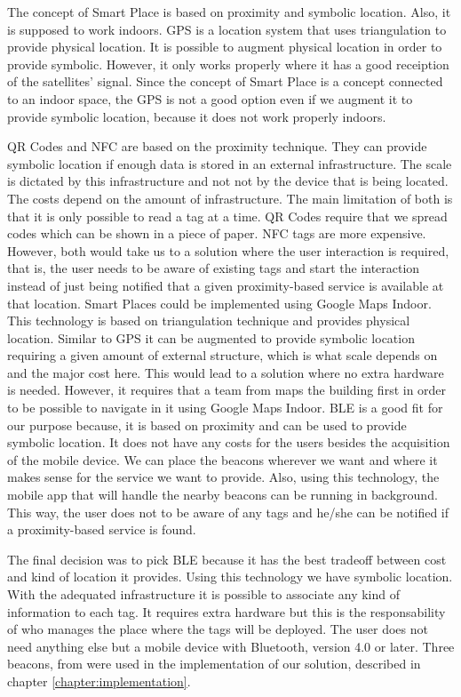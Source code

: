 The concept of Smart Place is based on proximity and symbolic location.
Also, it is supposed to work indoors.
\gls{GPS} is a location system that uses triangulation to provide physical location.
It is possible to augment physical location in order to provide symbolic.
However, it only works properly where it has a good receiption of the satellites' signal.
Since the concept of Smart Place is a concept connected to an indoor space, the \gls{GPS} is not a good option even if we augment it to provide symbolic location, because it does not work properly indoors.

\gls{QR} Codes and \gls{NFC} are based on the proximity technique.
They can provide symbolic location if enough data is stored in an external infrastructure.
The scale is dictated by this infrastructure and not not by the device that is being located.
The costs depend on the amount of infrastructure.
The main limitation of both is that it is only possible to read a tag at a time.
\gls{QR} Codes require that we spread codes which can be shown in a piece of paper.
\gls{NFC} tags are more expensive.
However, both would take us to a solution where the user interaction is required, that is, the user needs to be aware of existing tags and start the interaction instead of just being notified that a given proximity-based service is available at that location.
Smart Places could be implemented using Google Maps Indoor.
This technology is based on triangulation technique and provides physical location.
Similar to \gls{GPS} it can be augmented to provide symbolic location requiring a given amount of external structure, which is what scale depends on and the major cost here.
This would lead to a solution where no extra hardware is needed.
However, it requires that a team from  maps the building first in order to be possible to navigate in it using Google Maps Indoor.
\gls{BLE} is a good fit for our purpose because, it is based on proximity and can be used to provide symbolic location.
It does not have any costs for the users besides the acquisition of the mobile device.
We can place the beacons wherever we want and where it makes sense for the service we want to provide.
Also, using this technology, the mobile app that will handle the nearby beacons can be running in background.
This way, the user does not to be aware of any tags and he/she can be notified if a proximity-based service is found.

The final decision was to pick \gls{BLE} because it has the best tradeoff between cost and kind of location it provides. Using this technology we have symbolic location. With the adequated infrastructure it is possible to associate any kind of information to each tag.
It requires extra hardware but this is the responsability of who manages the place where the tags will be deployed.
The user does not need anything else but a mobile device with Bluetooth, version 4.0 or later.
Three beacons, from  were used in the implementation of our solution, described in chapter \ref{chapter:implementation}.

